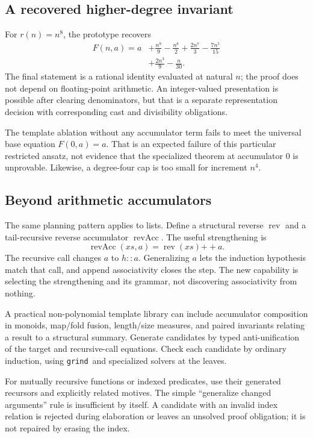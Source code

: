 \documentclass[11pt,a4paper]{article}
\newcommand{\grind}{\texttt{grind}}
\begin{document}
\subsection{A recovered higher-degree invariant}

For $r(n)=n^8$, the prototype recovers
\begin{align*}
F(n,a)=a
 &+\frac{n^9}{9}-\frac{n^8}{2}+\frac{2n^7}{3}
 -\frac{7n^5}{15}\\
 &+\frac{2n^3}{9}-\frac{n}{30}.
\end{align*}
The final statement is a rational identity evaluated at natural $n$; the proof does not depend on floating-point arithmetic. An integer-valued presentation is possible after clearing denominators, but that is a separate representation decision with corresponding cast and divisibility obligations.

The template ablation without any accumulator term fails to meet the universal base equation $F(0,a)=a$. That is an expected failure of this particular restricted ansatz, not evidence that the specialized theorem at accumulator $0$ is unprovable. Likewise, a degree-four cap is too small for increment $n^4$.

\subsection{Beyond arithmetic accumulators}

The same planning pattern applies to lists. Define a structural reverse $\operatorname{rev}$ and a tail-recursive reverse accumulator $\operatorname{revAcc}$. The useful strengthening is
\[
\operatorname{revAcc}(xs,a)=\operatorname{rev}(xs)\mathbin{++}a.
\]
The recursive call changes $a$ to $h::a$. Generalizing $a$ lets the induction hypothesis match that call, and append associativity closes the step. The new capability is selecting the strengthening and its grammar, not discovering associativity from nothing.

A practical non-polynomial template library can include accumulator composition in monoids, map/fold fusion, length/size measures, and paired invariants relating a result to a structural summary. Generate candidates by typed anti-unification of the target and recursive-call equations. Check each candidate by ordinary induction, using \grind\ and specialized solvers at the leaves.

For mutually recursive functions or indexed predicates, use their generated recursors and explicitly related motives. The simple ``generalize changed arguments'' rule is insufficient by itself. A candidate with an invalid index relation is rejected during elaboration or leaves an unsolved proof obligation; it is not repaired by erasing the index.
\end{document}
